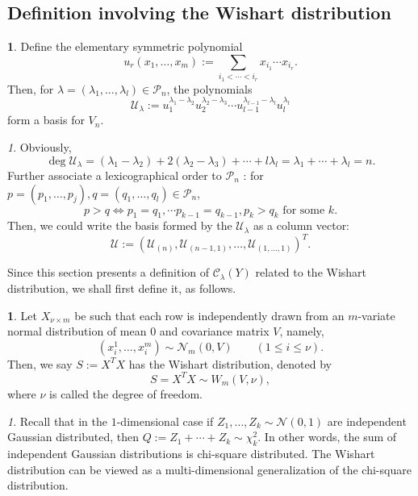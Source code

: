 \documentclass[10pt,oneside,american]{amsart}
\numberwithin{equation}{section}
\numberwithin{figure}{section}
\theoremstyle{plain}
\theoremstyle{definition}
\newtheorem{defn}[thm]{\protect\definitionname}
\theoremstyle{remark}
\newtheorem{rem}[thm]{\protect\remarkname}
\theoremstyle{plain}
\theoremstyle{definition}
\theoremstyle{plain}
\theoremstyle{plain}
\providecommand{\definitionname}{Definition}
\providecommand{\remarkname}{Remark}
\begin{document}
\subsection{Definition involving the Wishart distribution}
\begin{defn}
Define the elementary symmetric polynomial \cite[pp.~12, eq.~9]{Takemura}
\[
u_{r}(x_{1},\ldots,x_{m}):=\underset{i_{1}<\cdots<i_{r}}{\sum}x_{i_{1}}\cdots x_{i_{r}}.
\]
Then, for $\lambda=\left(\lambda_{1},\ldots,\lambda_{l}\right)\in\mathcal{P}_{n}$,
the polynomials \cite[pp.~12, eq.~10]{Takemura}
\[
\mathcal{U}_{\lambda}:=u_{1}^{\lambda_{1}-\lambda_{2}}u_{2}^{\lambda_{2}-\lambda_{3}}\cdots u_{l-1}^{\lambda_{l-1}-\lambda_{l}}u_{l}^{\lambda_{l}}
\]
\cite[pp.~13]{Takemura} form a basis for $V_{n}$.
\end{defn}
\begin{rem}
Obviously, 
\[
\deg\mathcal{U}_{\lambda}=\left(\lambda_{1}-\lambda_{2}\right)+2\left(\lambda_{2}-\lambda_{3}\right)+\cdots+l\lambda_{l}=\lambda_{1}+\cdots+\lambda_{l}=n.
\]
Further associate a lexicographical order to $\mathcal{P}_{n}$ \cite[pp.~9, eq.~7]{Takemura}:
for $p=\left(p_{1},\ldots,p_{j}\right),q=\left(q_{1},\ldots,q_{l}\right)\in\mathcal{P}_{n}$,
\[
p>q\Leftrightarrow p_{1}=q_{1},\cdots p_{k-1}=q_{k-1},p_{k}>q_{k}\text{ for some }k.
\]
Then, we could write the basis formed by the $\mathcal{U}_{\lambda}$
as a column vector:
\[
\mathcal{U}:=\left(\mathcal{U}_{\left(n\right)},\mathcal{U}_{\left(n-1,1\right)},\ldots,\mathcal{U}_{\left(1,\ldots,1\right)}\right)^{T}.
\]
\end{rem}
Since this section presents a definition of $\mathcal{C}_{\lambda}(Y)$
related to the Wishart distribution, we shall first define it, as follows.
\begin{defn}
Let $X_{\nu\times m}$ be such that each row is independently drawn
from an $m$-variate normal distribution of mean $0$ and covariance
matrix $V$, namely, 
\[
  \left(x_{i}^{1},\ldots,x_{i}^{m}\right)\sim\mathcal{N}_{m}(0,V)
  \qquad (1\leq i\leq\nu).
\]
Then, we say $S:=X^{T}X$ has the Wishart distribution, denoted by
\[
S=X^{T}X\sim W_{m}(V,\nu),
\]
where $\nu$ is called the degree of freedom.
\end{defn}
\begin{rem}
Recall that in the $1$-dimensional case if $Z_{1},\ldots,Z_{k}\sim\mathcal{N}(0,1)$
are independent Gaussian distributed, then $Q:=Z_{1}+\cdots+Z_{k}\sim\chi_{k}^{2}$.
In other words, the sum of independent Gaussian distributions is chi-square
distributed. The Wishart distribution can be viewed as a multi-dimensional
generalization of the chi-square distribution.
\end{rem}
\end{document}
